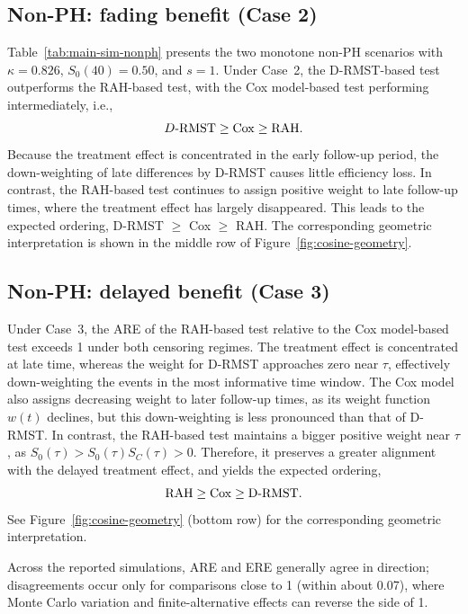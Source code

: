 \documentclass[12pt]{article}
\newcommand{\RAH}{\mathrm{RAH}}
\newcommand{\DRMST}{D\text{-}\mathrm{RMST}}
\newcommand{\AreEreNearOneBand}{0.07}
\begin{document}
\subsection{Non-PH: fading benefit (Case 2)}
\label{sec:sim-fading}

Table~\ref{tab:main-sim-nonph} presents the two monotone non-PH scenarios with $\kappa=0.826$, $S_0(40)=0.50$, and $s=1$. Under Case~2, the D-RMST-based test outperforms the RAH-based test, with the Cox model-based test performing intermediately, i.e.,
$$ \DRMST\ge \rm{Cox}\ge \RAH.$$
Because the treatment effect is concentrated in the early follow-up period, the down-weighting of late differences by D-RMST causes little efficiency loss. In contrast, the RAH-based test continues to assign positive weight to late follow-up times, where the treatment effect has largely disappeared. This leads to the expected ordering, D-RMST $\geq$ Cox $\geq$ RAH. The corresponding geometric interpretation is shown in the middle row of Figure~\ref{fig:cosine-geometry}.


\subsection{Non-PH: delayed benefit (Case 3)}
\label{sec:sim-delayed}

Under Case~3, the ARE of the RAH-based test relative to the Cox model-based test exceeds 1 under both censoring regimes. The treatment effect is concentrated at late time, whereas the weight for D-RMST approaches zero near $\tau$, effectively down-weighting the events in the most informative time window. The Cox model also assigns decreasing weight to later follow-up times, as its weight function $w(t)$ declines, but this down-weighting is less pronounced than that of D-RMST. In contrast, the RAH-based test maintains a bigger positive weight near $\tau$, as $S_0(\tau)>S_0(\tau)S_C(\tau)>0.$ Therefore, it preserves a greater alignment with the delayed treatment effect, and yields the expected ordering,
$$\RAH \ge \rm{Cox} \ge  \DRMST.$$
See Figure~\ref{fig:cosine-geometry} (bottom row) for the corresponding geometric interpretation.

Across the reported simulations, ARE and ERE generally agree in direction; disagreements occur only for comparisons close to 1 (within about \AreEreNearOneBand), where Monte Carlo variation and finite-alternative effects can reverse the side of 1.
\end{document}
